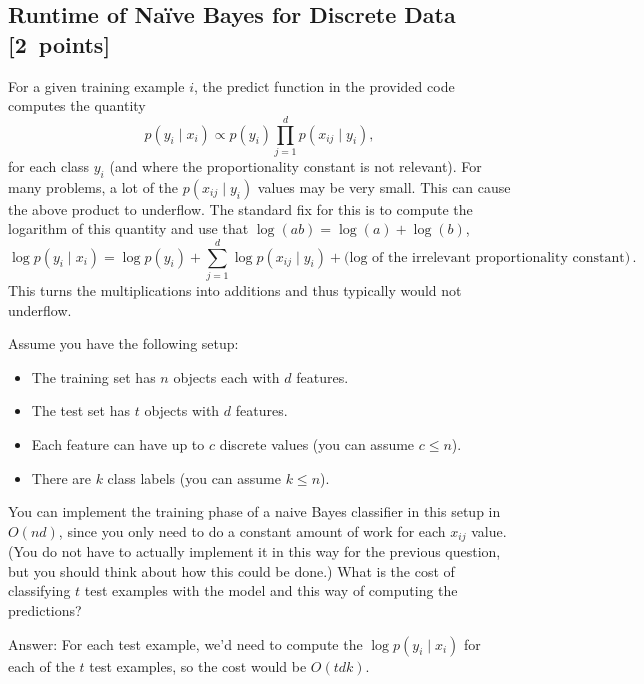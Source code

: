 \documentclass{article}
\newcommand{\blu}[1]{{\textcolor{blu}{#1}}}
\newenvironment{answer}{\par\begingroup\color{gre}Answer: }{\endgroup}
\let\ask\blu
\newcommand\pts[1]{\textcolor{pointscolour}{[#1~points]}}
\begin{document}
    \clearpage
    \subsection{Runtime of Na\"ive Bayes for Discrete Data \pts{2}}

    For a given training example $i$, the predict function in the provided code computes the quantity
    \[
    p(y_i \mid x_i) \propto p(y_i)\prod_{j=1}^d p(x_{ij} \mid y_i),
    \]
    for each class $y_i$ (and where the proportionality constant is not relevant). For many problems, a lot of the $p(x_{ij} \mid y_i)$ values may be very small. This can cause the above product to underflow. The standard fix for this is to compute the logarithm of this quantity and use that $\log(ab) = \log(a)+\log(b)$,
    \[
    \log p(y_i \mid x_i) = \log p(y_i) + \sum_{j=1}^d \log p(x_{ij} \mid y_i) + \text{(log of the irrelevant proportionality constant)} \, .
    \]
    This turns the multiplications into additions and thus typically would not underflow.

    Assume you have the following setup:
    \begin{itemize}
        \item The training set has $n$ objects each with $d$ features.
        \item The test set has $t$ objects with $d$ features.
        \item Each feature can have up to $c$ discrete values (you can assume $c \leq n$).
        \item There are $k$ class labels (you can assume $k \leq n$).
    \end{itemize}
    You can implement the training phase of a naive Bayes classifier in this setup in $O(nd)$, since you only need to do a constant amount of work for each $x_{ij}$ value. (You do not have to actually implement it in this way for the previous question, but you should think about how this could be done.)
    \ask{What is the cost of classifying $t$ test examples with the model and this way of computing the predictions?}
    
    \begin{answer}
        For each test example, we'd need to compute the $\log p(y_i \mid x_i)$ for each of the $t$ test examples, so the cost would be $O(tdk)$.
    \end{answer}


    \clearpage
\end{document}
